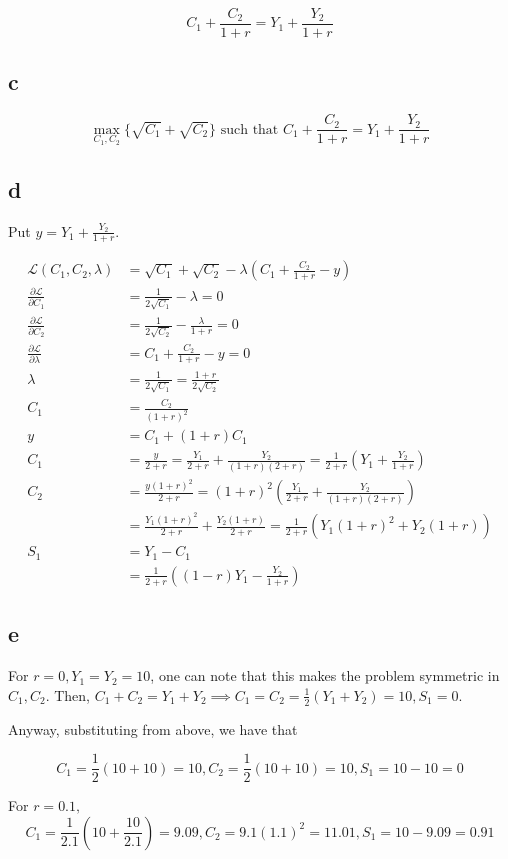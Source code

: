 \documentclass[12pt,letterpaper]{article}
\theoremstyle{definition}
\begin{document}
\[
  C_1 + \frac{C_2}{1 + r} = Y_1 + \frac{Y_2}{1+r}
\]

\subsection*{c}

\[
  \max_{C_1, C_2}\{\sqrt{C_1} + \sqrt{C_2}\} \text{ such that } C_1 + \frac{C_2}{1 + r} = Y_1 + \frac{Y_2}{1+r}
\]

\subsection*{d}

Put $y = Y_1 + \frac{Y_2}{1+r}$.

\begin{align*}
  \mathcal{L}(C_1, C_2, \lambda) &= \sqrt{C_1} + \sqrt{C_2} - \lambda(C_1 + \frac{C_2}{1+r} - y) \\
  \frac{\partial \mathcal{L}}{\partial C_1} &= \frac{1}{2\sqrt{C_1}} - \lambda = 0 \\
  \frac{\partial \mathcal{L}}{\partial C_2} &= \frac{1}{2\sqrt{C_2}} - \frac{\lambda}{1+r} = 0 \\
  \frac{\partial \mathcal{L}}{\partial \lambda} &= C_1 + \frac{C_2}{1+r} - y = 0 \\
  \lambda &= \frac{1}{2\sqrt{C_1}} = \frac{1+r}{2\sqrt{C_2}} \\
  C_1 &= \frac{C_2}{(1+r)^2} \\
  y &= C_1 + (1+r)C_1 \\
  C_1 &= \frac{y}{2 + r} = \frac{Y_1}{2+r} + \frac{Y_2}{(1+r)(2+r)} = \frac{1}{2+r}(Y_1 + \frac{Y_2}{1+r})\\
  C_2 &= \frac{y(1+r)^2}{2+r} = (1+r)^2(\frac{Y_1}{2+r} + \frac{Y_2}{(1+r)(2+r)}) \\
                                 &= \frac{Y_1(1+r)^2}{2+r} + \frac{Y_2(1+r)}{2+r} = \frac{1}{2+r}(Y_1(1+r)^2 + Y_2(1+r)) \\
  S_1 &= Y_1 - C_1 \\
                                 &= \frac{1}{2+r}((1-r)Y_1 - \frac{Y_2}{1+r})
\end{align*}

\subsection*{e}

For $r = 0, Y_1 = Y_2 = 10$, one can note that this makes the problem symmetric in $C_1, C_2$. Then, $C_1 +
C_2 = Y_1 + Y_2 \implies C_1 = C_2 = \frac{1}{2}(Y_1 + Y_2) = 10, S_1 = 0$.

Anyway, substituting from above, we have that

\[
  C_1 = \frac{1}{2}(10 + 10) = 10, C_2 = \frac{1}{2}(10 + 10) = 10, S_1 = 10 - 10
  = 0
\]

For $r = 0.1,$
\[
  C_1 = \frac{1}{2.1}(10 + \frac{10}{2.1}) = 9.09, C_2 = 9.1(1.1)^2 = 11.01, S_1
  = 10 - 9.09 = 0.91
\]
\end{document}
